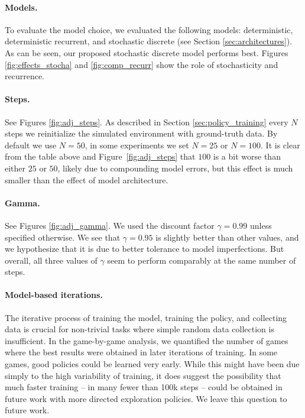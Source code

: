 \paragraph{Models.} To evaluate the model choice, we evaluated the following models: deterministic, deterministic recurrent, and stochastic discrete (see Section \ref{sec:architectures}). As can be seen, our proposed stochastic discrete model performs best. Figures \ref{fig:effects_stocha} and \ref{fig:comp_recurr} show the role of stochasticity and recurrence. 

\paragraph{Steps.} See Figures \ref{fig:adj_steps}. As described in Section \ref{sec:policy_training} every $N$ steps we reinitialize the simulated environment with ground-truth data. By default we use $N=50$, in some experiments 
we set $N=25$ or $N=100$. It is clear from the table above and Figure~\ref{fig:adj_steps} that $100$ is a bit worse than either $25$ or $50$, likely due to compounding model errors,
but this effect is much smaller than the effect of model architecture.

\paragraph{Gamma.} See Figures \ref{fig:adj_gamma}. We used the discount factor $\gamma=0.99$ unless specified otherwise.  We see that $\gamma=0.95$ is slightly better than other values, and we hypothesize that it is due to better tolerance to model imperfections. But overall, all three values of $\gamma$ seem to perform comparably at the same number of steps.


\paragraph{Model-based iterations.}
The iterative process of training the model, training the policy, and collecting data is crucial for non-trivial tasks where simple random data collection is insufficient. In the game-by-game analysis, we quantified the number of games where the best results were obtained in later iterations of training. In some games, good policies could be learned very early. While this might have been due simply to the high variability of training, it does suggest the possibility that much faster training -- in many fewer than 100k steps -- could be obtained in future work with more directed exploration policies. We leave this question to future work.

